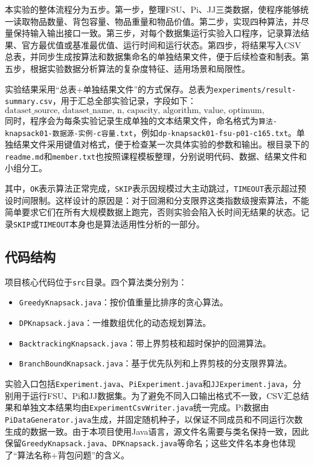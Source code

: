 \documentclass[10.5pt,a4paper,fontset=none]{ctexart}
\begin{document}
本实验的整体流程分为五步。第一步，整理FSU、Pi、JJ三类数据，使程序能够统一读取物品数量、背包容量、物品重量和物品价值。第二步，实现四种算法，并尽量保持输入输出接口一致。第三步，对每个数据集运行实验入口程序，记录算法结果、官方最优值或基准最优值、运行时间和运行状态。第四步，将结果写入CSV总表，并同步生成按算法和数据集命名的单独结果文件，便于后续检查和制表。第五步，根据实验数据分析算法的复杂度特征、适用场景和局限性。

实验结果采用“总表+单独结果文件”的方式保存。总表为\texttt{experiments/result-summary.csv}，用于汇总全部实验记录，字段如下：
\[
\text{dataset\_source, dataset\_name, n, capacity, algorithm, value, optimum, gap\_percent, time\_ms, status}
\]
同时，程序会为每条实验记录生成单独的文本结果文件，命名格式为\texttt{算法-knapsack01-数据源-实例-c容量.txt}，例如\texttt{dp-knapsack01-fsu-p01-c165.txt}。单独结果文件采用键值对格式，便于检查某一次具体实验的参数和输出。根目录下的\texttt{readme.md}和\texttt{member.txt}也按照课程模板整理，分别说明代码、数据、结果文件和小组分工。

其中，\texttt{OK}表示算法正常完成，\texttt{SKIP}表示因规模过大主动跳过，\texttt{TIMEOUT}表示超过预设时间限制。这样设计的原因是：对于回溯和分支限界这类指数级搜索算法，不能简单要求它们在所有大规模数据上跑完，否则实验会陷入长时间无结果的状态。记录\texttt{SKIP}或\texttt{TIMEOUT}本身也是算法适用性分析的一部分。

\subsection{代码结构}

项目核心代码位于\texttt{src}目录。四个算法类分别为：
\begin{itemize}
  \item \texttt{GreedyKnapsack.java}：按价值重量比排序的贪心算法。
  \item \texttt{DPKnapsack.java}：一维数组优化的动态规划算法。
  \item \texttt{BacktrackingKnapsack.java}：带上界剪枝和超时保护的回溯算法。
  \item \texttt{BranchBoundKnapsack.java}：基于优先队列和上界剪枝的分支限界算法。
\end{itemize}

实验入口包括\texttt{Experiment.java}、\texttt{PiExperiment.java}和\texttt{JJExperiment.java}，分别用于运行FSU、Pi和JJ数据集。为了避免不同入口输出格式不一致，CSV汇总结果和单独文本结果均由\texttt{ExperimentCsvWriter.java}统一完成。Pi数据由\texttt{PiDataGenerator.java}生成，并固定随机种子，以保证不同成员和不同运行次数生成的数据一致。由于本项目使用Java语言，源文件名需要与类名保持一致，因此保留\texttt{GreedyKnapsack.java}、\texttt{DPKnapsack.java}等命名；这些文件名本身也体现了“算法名称+背包问题”的含义。
\end{document}
